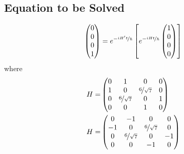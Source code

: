 \documentclass[aps]{revtex4-2}
\begin{document}
\subsection{Equation to be Solved}
\begin{equation}
    \begin{pmatrix}
        0\\
        0\\
        0\\
        1
    \end{pmatrix}=e^{-\nicefrac{iH't}{\hbar}}\left[e^{-\nicefrac{iHt}{\hbar}}\begin{pmatrix}
        1\\
        0\\
        0\\
        0
    \end{pmatrix}\right]
\end{equation}
where
\begin{align}
    H=&\begin{pmatrix}
        0&1&0&0\\
        1&0&\nicefrac{6}{\sqrt{7}}&0\\
        0&\nicefrac{6}{\sqrt{7}}&0&1\\
        0&0&1&0
    \end{pmatrix}\\
    H=&\begin{pmatrix}
        0&-1&0&0\\
        -1&0&\nicefrac{6}{\sqrt{7}}&0\\
        0&\nicefrac{6}{\sqrt{7}}&0&-1\\
        0&0&-1&0
    \end{pmatrix}
\end{align}
\end{document}
